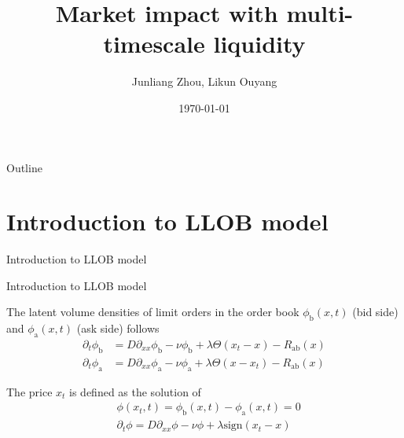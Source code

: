 \documentclass{beamer}
\title[An enhanced version of LLOB model]{Market impact with multi-timescale liquidity}
\author{Junliang Zhou, Likun Ouyang}
\institute{Baruch College, Master of Financial Engineering}
\date{\today}
\begin{document}
\begin{frame}
  \titlepage
\end{frame}

\begin{frame}{Outline}
  \tableofcontents
\end{frame}

\section{Introduction to LLOB model}

\begin{frame}{Introduction to LLOB model}
  \tableofcontents[currentsection]
\end{frame}

\begin{frame}{Introduction to LLOB model}

The latent volume densities of limit orders in the order book $\phi_\text{b}(x,t)$ (bid side) and $\phi_\text{a}(x,t)$ (ask side) follows
\begin{equation}\label{llobpde1}
\begin{split}
\partial_t\phi_\text{b} &= D\partial_{xx}\phi_\text{b}-\nu\phi_\text{b}+\lambda\Theta(x_t-x)-R_\text{ab}(x) \\
\partial_t\phi_\text{a} &= D\partial_{xx}\phi_\text{a}-\nu\phi_\text{a}+\lambda\Theta(x-x_t)-R_\text{ab}(x)
\end{split}
\end{equation}

The price $x_t$ is defined as the solution of
\begin{equation}\label{llobpde2}
\begin{split}
&\phi(x_t,t) = \phi_\text{b}(x,t)-\phi_\text{a}(x,t)=0 \\
&\partial_t\phi = D\partial_{xx}\phi-\nu\phi+\lambda\text{sign}(x_t-x)
\end{split}
\end{equation}

\end{frame}
\end{document}
